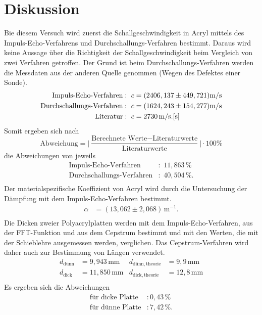 \section{Diskussion}
\label{sec:Diskussion}
Bie diesem Versuch wird zuerst die Schallgeschwindigkeit in Acryl mittels des Impuls-Echo-Verfahrens und Durchschallungs-Verfahren bestimmt.
Daraus wird keine Aussage über die Richtigkeit der Schallgeschwindigkeit beim Vergleich von zwei Verfahren getroffen.
 Der Grund ist beim Durchschallungs-Verfahren werden die Messdaten aus der anderen Quelle \cite{1} genommen (Wegen des Defektes einer Sonde).
\begin{align*}
    \text{Impuls-Echo-Verfahren}&:\,\, c= (2406,137\pm 449,721)\text{m/s}\\
    \text{Durchschallungs-Verfahren}&:\,\,c= (1624,243\pm 154,277)\text{m/s}\\
    \text{Literatur}&:\,\, c =2730 \, \text{m/s}.\text{\cite{s}}\\
   \end{align*}
Somit ergeben sich nach  
\begin{equation}
    \text{Abweichung} = \Big\vert\frac{{\text{Berechnete Werte}}-\text{Literaturwerte}}{\text{Literaturwerte}}\Big\vert \cdot 100 \%
\end{equation}
die Abweichungen von jeweils 
\begin{align*}
    \text{Impuls-Echo-Verfahren}&:\,\,11,863  \,\% \\
    \text{Durchschallungs-Verfahren}&:\,\,40,504 \,\% .\\  
\end{align*} 
Der materialspezifische Koeffizient von Acryl wird durch die Untersuchung der Dämpfung mit dem Impuls-Echo-Verfahren bestimmt.
\begin{align*}
\alpha &=(13,062\pm2,068)\, \text{m}^{-1}.\\
\end{align*} 
Die Dicken zweier Polyacrylplatten werden mit dem Impuls-Echo-Verfahren, aus der FFT-Funktion und aus dem Cepstrum bestimmt und  mit den Werten, die mit der Schieblehre ausgemessen werden, verglichen.
Das Cepstrum-Verfahren wird daher auch zur Bestimmung von Längen verwendet.
    \begin{align*}
        d_{\text{dünn}}&= 9,943\, \text{mm}  &   d_{\text{dünn},\,\text{theorie}} &= 9,9\, \text{mm} \\
        d_{\text{dick}}&= 11,850\, \text{mm}  &   d_{\text{dick},\,\text{theorie}} &= 12,8 \, \text{mm} \\
    \end{align*}
    Es ergeben sich die Abweichungen 
  \begin{align*}
    \text{für dicke Platte}&: 0,43\, \%\\
    \text{für dünne Platte}&: 7,42\, \%.\\
    \end{align*}
